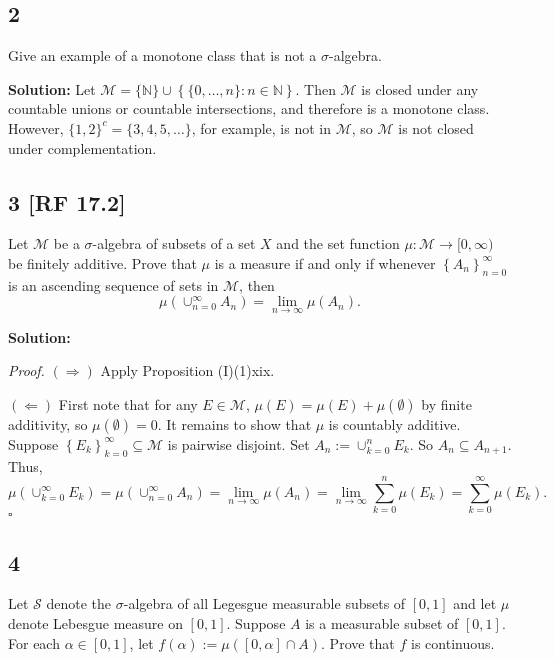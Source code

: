 \documentclass[12pt]{article}
\newcounter{ProofCounter}
\newenvironment{Proof}{\stepcounter{ProofCounter}\textit{Proof.}}{\hfill$\square$}
\begin{document}
\newpage
\subsection*{2}
Give an example of a monotone class that is not a $\sigma$-algebra.

{\bf Solution:} Let $\mathcal{M} = \{\mathbb{N}\} \cup \left\{ \{0,\hdots,n\} : n \in \mathbb{N} \right\}$. Then $\mathcal{M}$ is closed under any
countable unions or countable intersections, and therefore is a monotone class. However, $\{1,2\}^{c} = \{3, 4, 5, \hdots\}$, for example, is not in
$\mathcal{M}$, so $\mathcal{M}$ is not closed under complementation.



\subsection*{3 [RF 17.2]}
Let $\mathcal{M}$ be a $\sigma$-algebra of subsets of a set $X$ and the set function $\mu : \mathcal{M} \rightarrow [0, \infty)$ be finitely additive.
Prove that $\mu$ is a measure if and only if whenever $\left\{ A_{n} \right\}_{n=0}^{\infty}$ is an ascending sequence of sets in $\mathcal{M}$, then 
\[ \mu\left( \cup_{n=0}^{\infty}A_{n} \right) = \lim_{n\rightarrow\infty}\mu(A_{n}). \]

{\bf Solution:}

\begin{Proof}
$(\Rightarrow)$ Apply Proposition (I)(1)xix.

$(\Leftarrow)$ First note that for any $E \in \mathcal{M}$, $\mu(E) = \mu(E) + \mu(\emptyset)$ by finite additivity, so $\mu(\emptyset) = 0$. It
remains to show that $\mu$ is countably additive. Suppose $\left\{ E_{k} \right\}_{k=0}^{\infty} \subseteq \mathcal{M}$ is pairwise disjoint. Set
$A_{n} := \cup_{k=0}^{n}E_{k}$. So $A_{n} \subseteq A_{n+1}$. Thus,
\[ \mu\left( \cup_{k=0}^{\infty}E_{k} \right) = \mu\left( \cup_{n=0}^{\infty}A_{n} \right) = \lim_{n\rightarrow\infty}\mu(A_{n}) =
\lim_{n\rightarrow\infty}\sum_{k=0}^{n}\mu(E_{k}) = \sum_{k=0}^{\infty}\mu(E_{k}). \]
\end{Proof}


\subsection*{4}
Let $\mathcal{S}$ denote the $\sigma$-algebra of all Legesgue measurable subsets of $[0,1]$ and let $\mu$ denote Lebesgue measure on $[0,1]$. Suppose
$A$ is a measurable subset of $[0,1]$. For each $\alpha \in [0,1]$, let $f(\alpha) := \mu([0,\alpha]\cap A)$. Prove that $f$ is continuous.
\end{document}
